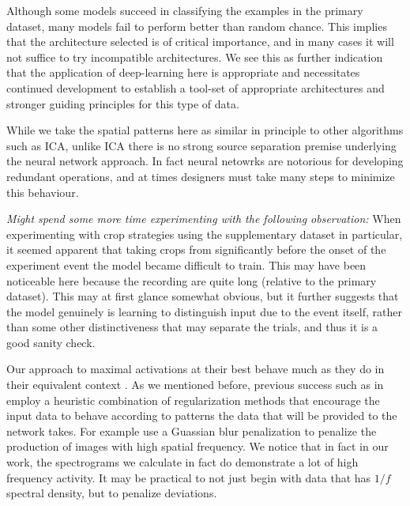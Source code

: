 \documentclass[utf8]{frontiersSCNS} %
\begin{document}

Although some models succeed in classifying the examples in the primary dataset, many models fail to perform better than random chance. This implies that the architecture selected is of critical importance, and in many cases it will not suffice to try incompatible architectures. We see this as further indication that the application of deep-learning here is appropriate and necessitates continued development to establish a tool-set of appropriate architectures and stronger guiding principles for this type of data.



While we take the spatial patterns here as similar in principle to other algorithms such as ICA, unlike ICA there is no strong source separation premise underlying the neural network approach. In fact neural netowrks are notorious for developing redundant operations, and at times designers must take many steps to minimize this behaviour. 

{\em Might spend some more time experimenting with the following observation:} When experimenting with crop strategies using the supplementary dataset in particular, it seemed apparent that taking crops from significantly before the onset of the experiment event the model became difficult to train. This may have been noticeable here because the recording are quite long (relative to the primary dataset). This may at first glance somewhat obvious, but it further suggests that the model genuinely is learning to distinguish input due to the event itself, rather than some other distinctiveness that may separate the trials, and thus it is a good sanity check.

Our approach to maximal activations at their best behave much as they do in their equivalent context . As we mentioned before, previous success such as in \cite{Yosinski2015} employ a heuristic combination of regularization methods that encourage the input data to behave according to patterns the data that will be provided to the network takes. For example \cite{Yosinski2015} use a Guassian blur penalization to penalize the production of images with high spatial frequency. We notice that in fact in our work, the spectrograms we calculate in fact do demonstrate a lot of high frequency activity. It may be practical to not just begin with data that has $1/f$ spectral density, but to penalize deviations.
\end{document}
